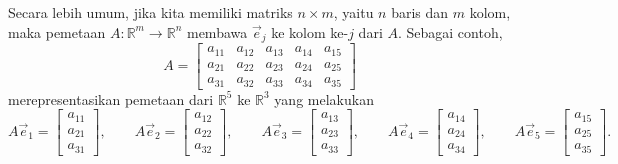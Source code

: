 Secara lebih umum, jika kita memiliki matriks $n \times m$, yaitu $n$ baris
dan $m$ kolom, maka pemetaan $A \colon {\mathbb R}^m \to {\mathbb R}^n$
membawa $\vec{e}_j$ ke kolom ke-$j$ dari $A$.
Sebagai contoh,
\begin{equation*}
A =
\begin{bmatrix}
a_{11} & a_{12} & a_{13} & a_{14} & a_{15} \\
a_{21} & a_{22} & a_{23} & a_{24} & a_{25} \\
a_{31} & a_{32} & a_{33} & a_{34} & a_{35}
\end{bmatrix}
\end{equation*}
merepresentasikan pemetaan dari ${\mathbb R}^5$ ke ${\mathbb R}^3$ yang melakukan
\begin{equation*}
A \vec{e}_1 =
\begin{bmatrix}
a_{11} \\ a_{21} \\ a_{31}
\end{bmatrix} ,
\qquad
A \vec{e}_2 =
\begin{bmatrix}
a_{12} \\ a_{22} \\ a_{32}
\end{bmatrix} ,
\qquad
A \vec{e}_3 =
\begin{bmatrix}
a_{13} \\ a_{23} \\ a_{33}
\end{bmatrix} ,
\qquad
A \vec{e}_4 =
\begin{bmatrix}
a_{14} \\ a_{24} \\ a_{34}
\end{bmatrix} ,
\qquad
A \vec{e}_5 =
\begin{bmatrix}
a_{15} \\ a_{25} \\ a_{35}
\end{bmatrix} .
\end{equation*}

